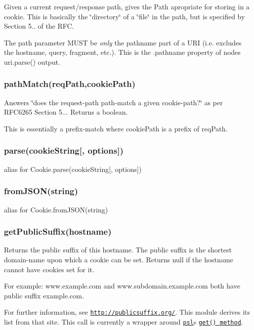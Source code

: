 Given a current request/response path, gives the Path apropriate for storing in a cookie. This is basically the \char`\"{}directory\char`\"{} of a \char`\"{}file\char`\"{} in the path, but is specified by Section 5.. of the R\+FC.

The {\ttfamily path} parameter M\+U\+ST be {\itshape only} the pathname part of a U\+RI (i.\+e. excludes the hostname, query, fragment, etc.). This is the {\ttfamily .pathname} property of node\textquotesingle{}s {\ttfamily uri.\+parse()} output.

\subsubsection*{{\ttfamily path\+Match(req\+Path,cookie\+Path)}}

Answers \char`\"{}does the request-\/path path-\/match a given cookie-\/path?\char`\"{} as per R\+F\+C6265 Section 5... Returns a boolean.

This is essentially a prefix-\/match where {\ttfamily cookie\+Path} is a prefix of {\ttfamily req\+Path}.

\subsubsection*{{\ttfamily parse(cookie\+String\mbox{[}, options\mbox{]})}}

alias for {\ttfamily Cookie.\+parse(cookie\+String\mbox{[}, options\mbox{]})}

\subsubsection*{{\ttfamily from\+J\+S\+O\+N(string)}}

alias for {\ttfamily Cookie.\+from\+J\+S\+O\+N(string)}

\subsubsection*{{\ttfamily get\+Public\+Suffix(hostname)}}

Returns the public suffix of this hostname. The public suffix is the shortest domain-\/name upon which a cookie can be set. Returns {\ttfamily null} if the hostname cannot have cookies set for it.

For example\+: {\ttfamily www.\+example.\+com} and {\ttfamily www.\+subdomain.\+example.\+com} both have public suffix {\ttfamily example.\+com}.

For further information, see \href{http://publicsuffix.org/}{\tt http\+://publicsuffix.\+org/}. This module derives its list from that site. This call is currently a wrapper around \href{https://www.npmjs.com/package/psl}{\tt {\ttfamily psl}}\textquotesingle{}s \href{https://www.npmjs.com/package/psl#pslgetdomain}{\tt get() method}.

